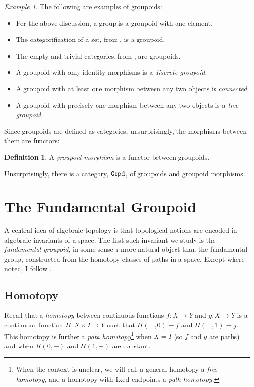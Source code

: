 \documentclass[11 pt]{amsart}
\theoremstyle{plain}   %
\theoremstyle{definition}
\newtheorem{defn}{Definition}[section]
\theoremstyle{remark}
\newtheorem{ex}{Example}[section]
\numberwithin{equation}{section}
\newcommand{\cat}[1]{{\normalfont\texttt{#1}}}
\begin{document}
\begin{ex}\label{groupoids}
	The following are examples of groupoids:
	\begin{itemize}
		\item Per the above discussion, a group is a groupoid with one element.
		\item The categorification of a set, from , is a
		      groupoid.
		\item The empty and trivial categories, from , are
		      groupoids.
		\item A groupoid with only identity morphisms is a \emph{discrete groupoid}.
		\item A groupoid with at least one morphism between any two objects is \emph{connected}.
		\item A groupoid with precisely one morphism between any two objects is a
		      \emph{tree groupoid}.
	\end{itemize}
\end{ex}

Since groupoids are defined as categories, unsurprisingly, the morphisms between
them are functors:

\begin{defn}\cite[Section 6.4]{Brown}
	A \emph{groupoid morphism} is a functor between groupoids.
\end{defn}

Unsurprisingly, there is a category, $\cat{Grpd}$, of groupoids and groupoid
morphisms.

\section{The Fundamental Groupoid} \label{the fundamental groupoid}

A central idea of algebraic topology is that topological notions are encoded in
algebraic invariants of a space. The first such invariant we study is the
\emph{fundamental groupoid}, in some sense a more natural object than the
fundamental group, constructed from the homotopy classes of paths in a space.
Except where noted, I follow \cite[Chapter 6]{Bradley}.

\subsection{Homotopy}\label{sec:homotopy}

Recall that a \emph{homotopy} between continuous functions $f: X\rightarrow Y$
and $g: X\rightarrow Y$ is a continuous function $H: X\times I\rightarrow Y$
such that $H(-, 0) = f$ and $H(-, 1) = g$. This homotopy is further a \emph{path
	homotopy}\footnote{ When the context is unclear, we will call a general homotopy
	a \emph{free homotopy}, and a homotopy with fixed endpoints a \emph{path
		homotopy}. } when $X = I$ (so $f$ and $g$ are paths) and when $H(0, -)$ and
$H(1, -)$ are constant.
\end{document}
